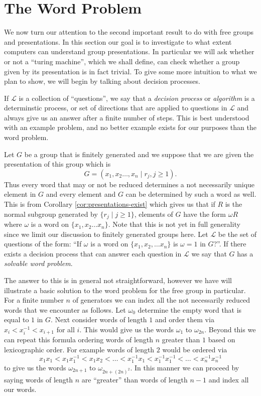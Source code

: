 \documentclass[12pt]{article}
\theoremstyle{definition}
\numberwithin{equation}{theorem}
\begin{document}
\section{The Word Problem}
We now turn our attention to the second important result to do with free groups and presentations. In this section our goal is to investigate to what extent computers can understand group presentations. In particular we will ask whether or not a ``turing machine'', which we shall define, can check whether a group given by its presentation is in fact trivial. To give some more intuition to what we plan to show, we will begin by talking about decision processes.

If $\mathcal{L}$ is a collection of ``questions'', we say that a \emph{decision process} or \emph{algorithm} is a determinstic process, or set of directions that are applied to questions
in $\mathcal{L}$ and always give us an answer after a finite number of steps. This is best understood with an example problem, and no better example exists for our purposes than the word problem.

Let $G$ be a group that is finitely generated and we suppose that we are given the presentation of this group which is
\begin{equation*}
  G = (x_1,x_2\dots,x_n \mid r_j,j \geq 1).
\end{equation*}
Thus every word that may or not be reduced determines a not necessarily unique element in $G$ and every element and $G$ can be determined by such a word as well. This is from Corollary \ref{cor:presentations-exist} which gives us that if $R$ is the normal subgroup generated by $\{r_j \mid j \geq 1\}$, elements of $G$ have the form $\omega R$ where $\omega$ is a word on $\{x_1,x_2 \dots x_n\}$. Note that this is not yet in full generality since we limit our discussion to finitely generated groups here. Let $\mathcal{L}$ be the set of questions of the form: ``If $\omega$ is a word on $\{x_1,x_2, \dots x_n \}$ is $\omega = 1$ in $G$?''.
If there exists a decision process that can answer each question in $\mathcal{L}$ we say that $G$ has a \emph{solvable word problem}.

The answer to this is in general not straightforward, however we have will illustrate a basic solution to the word problem for the free group in particular. For a finite number $n$ of generators we can index all the not necessarily reduced words that we encounter as follows. Let $\omega_0$ determine the empty word that is equal to $1$ in $G$. Next consider words of length $1$ and order them via $x_i < x_i^{-1}< x_{i+1}$ for all $i$. This would give us the words $\omega_1$ to $\omega_{2n}$. Beyond this we can repeat this formula ordering words of length $n$ greater than $1$ based on lexicographic order. For example words of length $2$ would be ordered via
\begin{equation*}
  x_1x_1 < x_1x_1^{-1} < x_1x_2 < \dots < x_1^{-1}x_1 < x_1^{-1}x_1^{-1} < \dots < x_n^{-1}x_n^{-1}
\end{equation*}
to give us the words $\omega_{2n + 1}$ to $\omega_{2n + (2n)^2}$. In this manner we can proceed by saying words of length $n$ are ``greater'' than words of length $n-1$ and index all our words.
\end{document}
